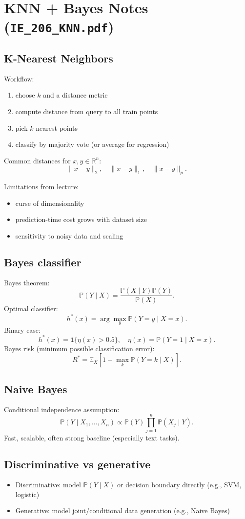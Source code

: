 \documentclass[11pt]{article}
\newcommand{\R}{\mathbb{R}}
\newcommand{\E}{\mathbb{E}}
\newcommand{\PP}{\mathbb{P}}
\newcommand{\1}{\mathbf{1}}
\begin{document}
\section{KNN + Bayes Notes (\texttt{IE\_206\_KNN.pdf})}
\subsection*{K-Nearest Neighbors}
Workflow:
\begin{enumerate}
\item choose $k$ and a distance metric
\item compute distance from query to all train points
\item pick $k$ nearest points
\item classify by majority vote (or average for regression)
\end{enumerate}

Common distances for $x,y\in\R^n$:
\[
\|x-y\|_2,\quad \|x-y\|_1,\quad \|x-y\|_p.
\]

Limitations from lecture:
\begin{itemize}
\item curse of dimensionality
\item prediction-time cost grows with dataset size
\item sensitivity to noisy data and scaling
\end{itemize}

\subsection*{Bayes classifier}
Bayes theorem:
\[
\PP(Y\mid X)=\frac{\PP(X\mid Y)\PP(Y)}{\PP(X)}.
\]
Optimal classifier:
\[
h^*(x)=\arg\max_y \PP(Y=y\mid X=x).
\]
Binary case:
\[
h^*(x)=\1\{\eta(x)>0.5\},\quad \eta(x)=\PP(Y=1\mid X=x).
\]
Bayes risk (minimum possible classification error):
\[
R^*=\E_X\left[1-\max_k\PP(Y=k\mid X)\right].
\]

\subsection*{Naive Bayes}
Conditional independence assumption:
\[
\PP(Y\mid X_1,\dots,X_n)\propto \PP(Y)\prod_{j=1}^n \PP(X_j\mid Y).
\]
Fast, scalable, often strong baseline (especially text tasks).

\subsection*{Discriminative vs generative}
\begin{itemize}
\item Discriminative: model $\PP(Y\mid X)$ or decision boundary directly (e.g., SVM, logistic)
\item Generative: model joint/conditional data generation (e.g., Naive Bayes)
\end{itemize}
\end{document}
